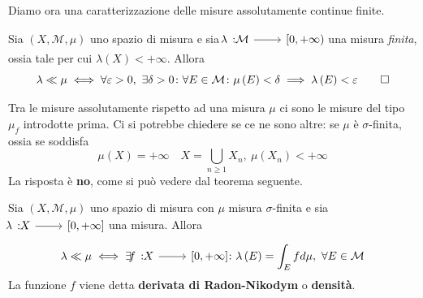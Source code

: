 Diamo ora una caratterizzazione delle misure assolutamente continue finite.
\begin{theoremaqed}
Sia $\left(X,\mathcal{M},\mu\right)$ uno spazio di misura e sia $\funz{\lambda}{\mathcal{M}}{\left[0,+\infty\right)}$ una misura \textit{finita}, ossia tale per cui $\lambda\left(X\right)<+\infty$.
Allora
\begin{equation}
	\lambda\ll\mu\iff\forall \epsilon>0,\ \exists\delta>0\colon\forall E\in\mathcal{M}\colon \mu\left(E\right)<\delta\implies \lambda\left(E\right)<\epsilon\qedhere
\end{equation}
\end{theoremaqed}
Tra le misure assolutamente rispetto ad una misura $\mu$ ci sono le misure del tipo $\mu_f$ introdotte prima. Ci si potrebbe chiedere se ce ne sono altre: se $\mu$ è $\sigma$-finita, ossia se soddisfa
\begin{equation*}
	\mu\left(X\right)=+\infty\quad X=\bigcup_{n\geq 1}X_n,\ \mu\left(X_n\right)<+\infty
\end{equation*}
La risposta è \textbf{no}, come si può vedere dal teorema seguente.
\begin{theoremaqed}
	Sia $\left(X,\mathcal{M},\mu\right)$ uno spazio di misura con $\mu$ misura $\sigma$-finita e sia $\funz{\lambda}{X}{\left[0,+\infty\right]}$ una misura. Allora
	\begin{equation}
		\lambda\ll\mu\iff \exists \funz{f}{X}{\left[0,+\infty\right]}\colon\lambda\left(E\right)=\int_Efd\mu,\ \forall E\in\mathcal{M}
	\end{equation}
La funzione $f$ viene detta \textbf{derivata di Radon-Nikodym} o \textbf{densità}.
\end{theoremaqed}
